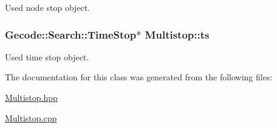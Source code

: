 Used node stop object. 

\hypertarget{class_multistop_a6cf22f443f85c506ef15bdfd494bfb2a}{
\subsubsection[{ts}]{\setlength{\rightskip}{0pt plus 5cm}Gecode\-::\-Search\-::\-Time\-Stop$\ast$ Multistop\-::ts\hspace{0.3cm}{\ttfamily [private]}}}\label{class_multistop_a6cf22f443f85c506ef15bdfd494bfb2a}


Used time stop object. 



The documentation for this class was generated from the following files\-:\begin{DoxyCompactItemize}
\item 
\hyperlink{_multistop_8hpp}{Multistop.\-hpp}\item 
\hyperlink{_multistop_8cpp}{Multistop.\-cpp}\end{DoxyCompactItemize}

